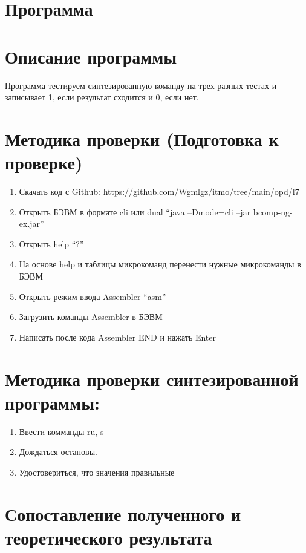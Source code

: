 \documentclass{article}
\begin{document}
\section{Программа}



\section{Описание программы}
Программа тестируем синтезированную команду на трех разных тестах и записывает 1, если результат сходится и 0, если нет.




\section{Методика проверки (Подготовка к проверке)}
\begin{enumerate}

  \item Скачать код с Github: https://github.com/Wgmlgz/itmo/tree/main/opd/l7
  \item Открыть БЭВМ в формате cli или dual “java –Dmode=cli –jar bcomp-ng-ex.jar”
  \item Открыть help “?”
  \item На основе help и таблицы микрокоманд перенести нужные микрокоманды в БЭВМ
  \item Открыть режим ввода Assembler “asm”
  \item Загрузить команды Assembler в БЭВМ
  \item Написать после кода Assembler END и нажать Enter
\end{enumerate}

\section{Методика проверки синтезированной программы:}
\begin{enumerate}
  \item Ввести комманды ru, s
  \item Дождаться остановы.
  \item Удостовериться, что значения правильные
\end{enumerate}

\section{Сопоставление полученного и теоретического результата}
\end{document}
